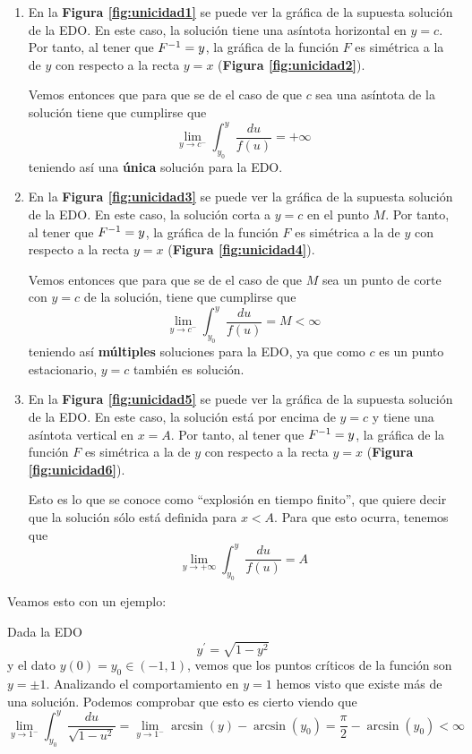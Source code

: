 \begin{enumerate}
\item En la \textbf{Figura \ref{fig:unicidad1}} se puede ver la gráfica de la supuesta solución de la EDO. En este caso, la solución tiene una asíntota horizontal en $y=c$. Por tanto, al tener que $F^{-1} = y$, la gráfica de la función $F$ es simétrica a la de $y$ con respecto a la recta $y=x$ (\textbf{Figura \ref{fig:unicidad2}}).

Vemos entonces que para que se de el caso de que $c$ sea una asíntota de la solución tiene que cumplirse que $$\lim _{y\to c^-} \int_{y_0}^y \frac{du}{f(u)} = +\infty$$
teniendo así una \textbf{única} solución para la EDO.

\item En la \textbf{Figura \ref{fig:unicidad3}} se puede ver la gráfica de la supuesta solución de la EDO. En este caso, la solución corta a $y=c$ en el punto $M$. Por tanto, al tener que $F^{-1} = y$, la gráfica de la función $F$ es simétrica a la de $y$ con respecto a la recta $y=x$ (\textbf{Figura \ref{fig:unicidad4}}).

Vemos entonces que para que se de el caso de que $M$ sea un punto de corte con $y=c$ de la solución, tiene que cumplirse que $$\lim _{y\to c^-} \int_{y_0}^y \frac{du}{f(u)} = M \lt \infty$$
teniendo así \textbf{múltiples} soluciones para la EDO, ya que como $c$ es un punto estacionario, $y=c$ también es solución.

\item En la \textbf{Figura \ref{fig:unicidad5}} se puede ver la gráfica de la supuesta solución de la EDO. En este caso, la solución está por encima de $y=c$ y tiene una asíntota vertical en $x=A$. Por tanto, al tener que $F^{-1} = y$, la gráfica de la función $F$ es simétrica a la de $y$ con respecto a la recta $y=x$ (\textbf{Figura \ref{fig:unicidad6}}).

Esto es lo que se conoce como ``explosión en tiempo finito'', que quiere decir que la solución sólo está definida para $x\lt A$. Para que esto ocurra, tenemos que $$\lim _{y\to + \infty} \int_{y_0}^y \frac{du}{f(u)} = A$$
\end{enumerate}

Veamos esto con un ejemplo:

\begin{example}
Dada la EDO $$y^\prime = \sqrt{1-y^2}$$ y el dato $y(0) = y_0\in(-1,1)$, 
vemos que los puntos críticos de la función son $y=\pm1$.
Analizando el comportamiento en $y=1$ hemos visto que existe más de una solución. Podemos comprobar que esto es cierto viendo que
$$\lim_{y\to 1^-}\int_{y_0}^y \frac{du}{\sqrt{1-u^2}} = \lim_{y\to 1^-} \arcsin(y) - \arcsin(y_0) = \frac{\pi}{2}-\arcsin(y_0) \lt \infty$$
\end{example}

